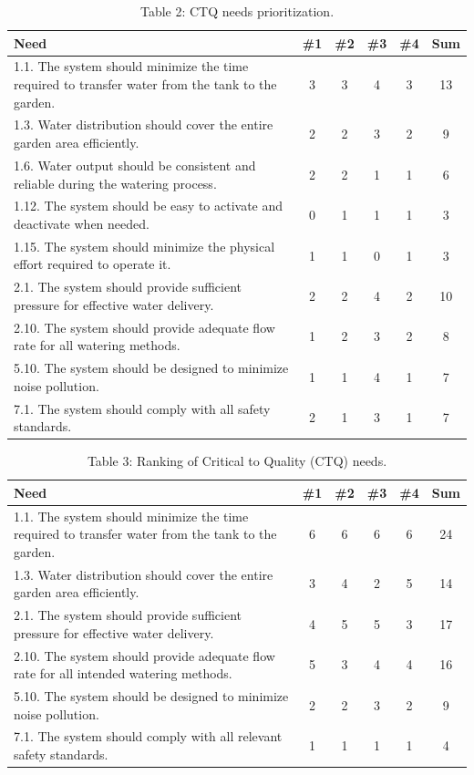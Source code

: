 \documentclass[11pt]{article}
\begin{document}
\begin{table}[H]
\centering
\caption*{Table 2: CTQ needs prioritization.}
\label{table:2}
\begin{tabular}{|p{11cm}|c|c|c|c|c|}
\hline
\textbf{Need} & \textbf{\#1} & \textbf{\#2} & \textbf{\#3} & \textbf{\#4} & \textbf{Sum} \\
\hline
1.1. The system should minimize the time required to transfer water from the tank to the garden. & 3 & 3 & 4 & 3 & \cellcolor{yellow}13 \\
1.3. Water distribution should cover the entire garden area efficiently. & 2 & 2 & 3 & 2 & \cellcolor{yellow}9 \\
1.6. Water output should be consistent and reliable during the watering process. & 2 & 2 & 1 & 1 & 6 \\
1.12. The system should be easy to activate and deactivate when needed. & 0 & 1 & 1 & 1 & 3 \\
1.15. The system should minimize the physical effort required to operate it. & 1 & 1 & 0 & 1 & 3 \\
\hline
2.1. The system should provide sufficient pressure for effective water delivery. & 2 & 2 & 4 & 2 & \cellcolor{yellow}10 \\
2.10. The system should provide adequate flow rate for all watering methods. & 1 & 2 & 3 & 2 & \cellcolor{yellow}8 \\
\hline
5.10. The system should be designed to minimize noise pollution. & 1 & 1 & 4 & 1 & \cellcolor{yellow}7 \\
\hline
7.1. The system should comply with all safety standards. & 2 & 1 & 3 & 1 & \cellcolor{yellow}7 \\
\hline
\end{tabular}
\end{table}

\begin{table}[H]
\centering
\caption*{Table 3: Ranking of Critical to Quality (CTQ) needs.}
\label{table:3}
\begin{tabular}{|p{11cm}|c|c|c|c|c|}
\hline
\textbf{Need} & \textbf{\#1} & \textbf{\#2} & \textbf{\#3} & \textbf{\#4} & \textbf{Sum} \\
\hline
1.1. The system should minimize the time required to transfer water from the tank to the garden. & 6 & 6 & 6 & 6 & 24 \\
1.3. Water distribution should cover the entire garden area efficiently. & 3 & 4 & 2 & 5 & 14 \\
2.1. The system should provide sufficient pressure for effective water delivery. & 4 & 5 & 5 & 3 & 17 \\
2.10. The system should provide adequate flow rate for all intended watering methods. & 5 & 3 & 4 & 4 & 16 \\
5.10. The system should be designed to minimize noise pollution. & 2 & 2 & 3 & 2 & 9 \\
7.1. The system should comply with all relevant safety standards. & 1 & 1 & 1 & 1 & 4 \\
\hline
\end{tabular}
\end{table}
\end{document}
